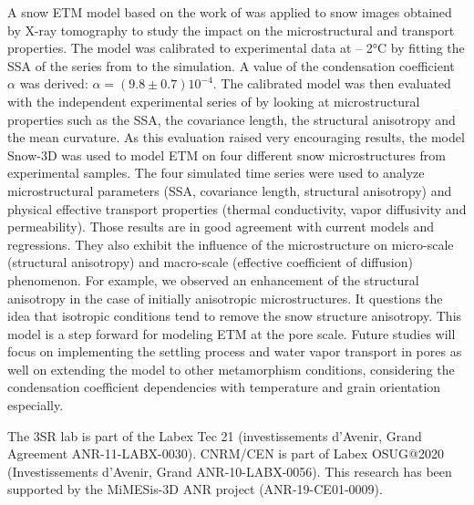 \documentclass[draft,ms]{agujournal2019}
\begin{document}
A snow ETM model based on the work of  was applied to snow images obtained by X-ray tomography to study the impact on the microstructural and transport properties. The model was calibrated to experimental data at – 2°C by fitting the SSA of the series from  to the simulation. A value of the condensation coefficient $\alpha$ was derived: $\alpha = ( 9.8 \pm 0.7) 10^{-4}$. The calibrated model was then evaluated with the independent experimental series of  by looking at microstructural properties such as the SSA, the covariance length, the structural anisotropy and the mean curvature. As this evaluation raised very encouraging results, the model Snow-3D was used to model ETM on four different snow microstructures from experimental samples. The four simulated time series were used to analyze microstructural parameters (SSA, covariance length, structural anisotropy) and physical effective transport properties (thermal conductivity, vapor diffusivity and permeability). Those results are in good agreement with current models and regressions. They also exhibit the influence of the microstructure on micro-scale (structural anisotropy) and macro-scale (effective coefficient of diffusion) phenomenon. For example, we observed an enhancement of the structural anisotropy in the case of initially anisotropic microstructures. It questions the idea that isotropic conditions tend to remove the snow structure anisotropy. This model is a step forward for modeling ETM at the pore scale. Future studies will focus on implementing the settling process and water vapor transport in pores as well on extending the model to other metamorphism conditions, considering the condensation coefficient dependencies with temperature and grain orientation especially.

\acknowledgments
The 3SR lab is part of the Labex Tec 21 (investissements d'Avenir, Grand Agreement ANR-11-LABX-0030). CNRM/CEN is part of Labex OSUG@2020 (Investissements d'Avenir, Grand ANR-10-LABX-0056). This research has been supported by the MiMESis-3D ANR project (ANR-19-CE01-0009).


\end{document}
